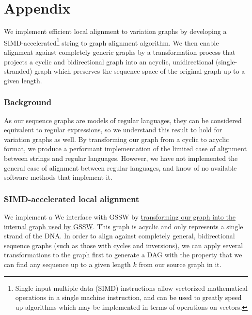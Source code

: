 \documentclass[12pt]{article}
\begin{document}
{}



\newpage
\appendix
\section{Appendix}

We implement efficient local alignment to variation graphs by developing a SIMD-accelerated\footnote{Single input multiple data (SIMD) instructions allow vectorized mathematical operations in a single machine instruction, and can be used to greatly speed up algorithms which may be implemented in terms of operations on vectors.} string to graph alignment algorithm. We then enable alignment against completely generic graphs by a transformation process that projects a cyclic and bidirectional graph into an acyclic, unidirectional (single-stranded) graph which preserves the sequence space of the original graph up to a given length.

\subsubsection{Background}


As our sequence graphs are models of regular languages, they can be considered equivalent to regular expressions, so we understand this result to hold for variation graphs as well.
By transforming our graph from a cyclic to acyclic format, we produce a performant implementation of the limited case of alignment between strings and regular languages. However, we have not implemented the general case of alignment between regular languages, and know of no available software methods that implement it.

\subsubsection{SIMD-accelerated local alignment}

We implement a 
We interface with GSSW by \href{https://github.com/vgteam/vg/blob/fbcb6e62/src/vg.cpp#L6461-L6532}{transforming our graph into the internal graph used by GSSW}.
This graph is acyclic and only represents a single strand of the DNA.
In order to align against completely general, bidirectional sequence graphs (such as those with cycles and inversions), we can apply several transformations to the graph first to generate a DAG with the property that we can find any sequence up to a given length $k$ from our source graph in it.
\end{document}
